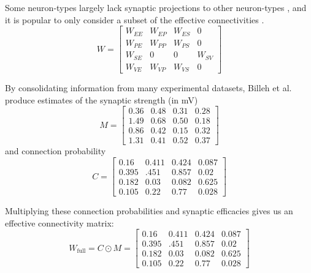 \documentclass[11pt]{article}
\begin{document}
Some neuron-types largely lack synaptic projections to other neuron-types \cite{pfeffer2013inhibition}, and it is popular to only consider a subset of the effective connectivities \cite{litwin2016inhibitory, GarciaDelMolino2017, Chen2019}.
\begin{equation} \label{eq:V1_W}
W = \begin{bmatrix} W_{EE} & W_{EP} & W_{ES} & 0 \\
                                W_{PE} & W_{PP} & W_{PS} & 0 \\
                                W_{SE} & 0 & 0 & W_{SV} \\
                                W_{VE} & W_{VP} &  W_{VS} &  0 \end{bmatrix}
\end{equation}

By consolidating information from many experimental datasets, Billeh et al. \cite{billeh2019systematic} produce estimates of the synaptic strength (in mV)
\begin{equation}
M = \begin{bmatrix} 0.36 & 0.48 & 0.31 & 0.28 \\
1.49 & 0.68 & 0.50 & 0.18 \\
0.86 & 0.42 & 0.15 & 0.32 \\
1.31 & 0.41 & 0.52 & 0.37 \end{bmatrix}
\end{equation}
and connection probability
\begin{equation}
C = \begin{bmatrix} 0.16 & 0.411 & 0.424 &  0.087 \\
0.395 & .451 & 0.857 & 0.02 \\
0.182 & 0.03 & 0.082 & 0.625 \\
0.105 & 0.22 & 0.77 & 0.028 \end{bmatrix}
\end{equation}

Multiplying these connection probabilities and synaptic efficacies gives us an effective connectivity matrix:
\begin{equation}
W_{\text{full}} = C \odot M = \begin{bmatrix} 0.16 & 0.411 & 0.424 &  0.087 \\
0.395 & .451 & 0.857 & 0.02 \\
0.182 & 0.03 & 0.082 & 0.625 \\
0.105 & 0.22 & 0.77 & 0.028 \end{bmatrix}
\end{equation}
\end{document}
